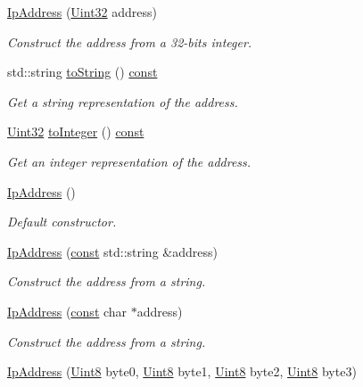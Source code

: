 \begin{DoxyCompactItemize}
\hyperlink{classsf_1_1_ip_address_a8ed34ba3a40d70eb9f09ac5ae779a162}{Ip\-Address} (\hyperlink{namespacesf_aa746fb1ddef4410bddf198ebb27e727c}{Uint32} address)
\begin{DoxyCompactList}\small\item\em Construct the address from a 32-\/bits integer. \end{DoxyCompactList}\item 
std\-::string \hyperlink{classsf_1_1_ip_address_a52f4be92fb0ceb689abc469e4a85fd82}{to\-String} () \hyperlink{term__entry_8h_a57bd63ce7f9a353488880e3de6692d5a}{const} 
\begin{DoxyCompactList}\small\item\em Get a string representation of the address. \end{DoxyCompactList}\item 
\hyperlink{namespacesf_aa746fb1ddef4410bddf198ebb27e727c}{Uint32} \hyperlink{classsf_1_1_ip_address_af42678b08b23def2560aed7d98b24d89}{to\-Integer} () \hyperlink{term__entry_8h_a57bd63ce7f9a353488880e3de6692d5a}{const} 
\begin{DoxyCompactList}\small\item\em Get an integer representation of the address. \end{DoxyCompactList}\item 
\hyperlink{classsf_1_1_ip_address_af32a0574baa0f46e48deb2d83ca7658b}{Ip\-Address} ()
\begin{DoxyCompactList}\small\item\em Default constructor. \end{DoxyCompactList}\item 
\hyperlink{classsf_1_1_ip_address_a656b7445ab04cabaa7398685bc09c3f7}{Ip\-Address} (\hyperlink{term__entry_8h_a57bd63ce7f9a353488880e3de6692d5a}{const} std\-::string \&address)
\begin{DoxyCompactList}\small\item\em Construct the address from a string. \end{DoxyCompactList}\item 
\hyperlink{classsf_1_1_ip_address_a92f2a9be74334a61b96c2fc79fe6eb78}{Ip\-Address} (\hyperlink{term__entry_8h_a57bd63ce7f9a353488880e3de6692d5a}{const} char $\ast$address)
\begin{DoxyCompactList}\small\item\em Construct the address from a string. \end{DoxyCompactList}\item 
\hyperlink{classsf_1_1_ip_address_a1d289dcb9ce7a64c600c6f84cba88cc6}{Ip\-Address} (\hyperlink{namespacesf_a4ef3d630785c4f296f9b4f274c33d78e}{Uint8} byte0, \hyperlink{namespacesf_a4ef3d630785c4f296f9b4f274c33d78e}{Uint8} byte1, \hyperlink{namespacesf_a4ef3d630785c4f296f9b4f274c33d78e}{Uint8} byte2, \hyperlink{namespacesf_a4ef3d630785c4f296f9b4f274c33d78e}{Uint8} byte3)

\end{DoxyCompactItemize}
